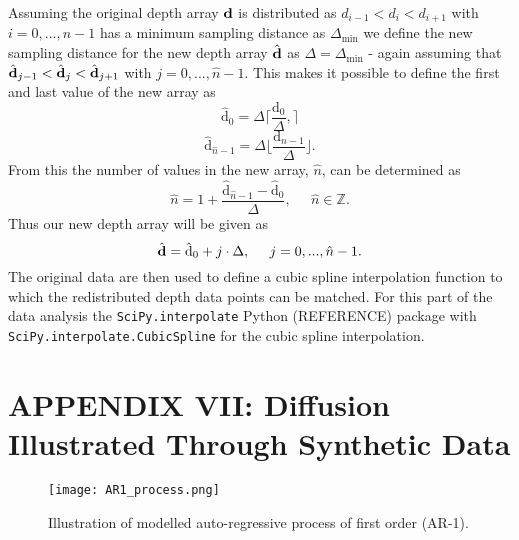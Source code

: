 \documentclass[../../CompleteThesis2/Complete_2ndDraft.tex]{subfiles}
\begin{document}
	Assuming the original depth array $\text{\textbf{d}}$ is distributed as $d_{i-1} < d_i < d_{i+1}$ with $i = 0, ..., n-1$ has a minimum sampling distance as $\Delta_{\text{min}}$ we define the new sampling distance for the new depth array $\hat{\text{\textbf{d}}}$ as $\Delta =\Delta_{\text{min}}$ - again assuming that $\hat{\text{\textbf{d}}}_{j-1} < \hat{\text{\textbf{d}}}_j < \hat{\text{\textbf{d}}}_{j+1}$ with $j = 0, ..., \hat{n}-1$. This makes it possible to define the first and last value of the new array as
	\begin{equation}
		\hat{\text{d}}_0 = \Delta \lceil \frac{\text{d}_0}{\Delta}, \rceil 
		\label{Eq:InterpDepthMin}
	\end{equation}
	\begin{equation}
		\hat{\text{d}}_{\hat{n}-1} = \Delta \lfloor \frac{\text{d}_{n-1}}{\Delta} \rfloor.
		\label{Eq:InterpDepthMax}
	\end{equation}
	From this the number of values in the new array, $\hat{n}$, can be determined as
	\begin{equation}
		\hat{n} = 1 +  \frac{\hat{\text{d}}_{\hat{n}-1} - \hat{\text{d}}_0}{\Delta},\;\;\;\;\; \hat{n} \in\mathbb{Z}.
	\end{equation}
	Thus our new depth array will be given as
	\begin{equation}
		\hat{\text{\textbf{d}}} = \hat{\text{d}}_0 + j\cdot\Delta,\;\;\;\;\; j = 0, ..., \hat{n}-1.
	\end{equation}
	The original data are then used to define a cubic spline interpolation function to which the redistributed depth data points can be matched. For this part of the data analysis the \lstinline[columns=fixed]|SciPy.interpolate| Python (REFERENCE) package with \lstinline[columns=fixed]|SciPy.interpolate.CubicSpline| for the cubic spline interpolation.
	
	
		
	
	\newpage
	\section[Appendix VII: Synthetic Diffusion]{APPENDIX VII: Diffusion Illustrated Through Synthetic Data}
	\label{AppVII:SignalAnalysis_SyntheticData}
	\begin{figure}[h]
		\centering
		\texttt{[image: AR1\_process.png]}
		\caption[Illustration of AR-1 process.]{\small Illustration of modelled auto-regressive process of first order (AR-1).}
		\label{fig:AR1_process}
	\end{figure}
	
\end{document}
